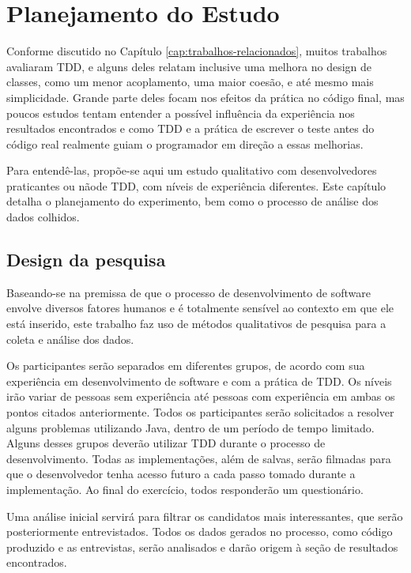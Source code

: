 \chapter{Planejamento do Estudo}
\label{cap:planejamento}

Conforme discutido no Capítulo \ref{cap:trabalhos-relacionados}, muitos 
trabalhos avaliaram TDD, e alguns deles relatam inclusive uma melhora
no design de classes, como um menor acoplamento, uma maior coesão, e até mesmo
mais simplicidade. 
Grande parte deles focam nos efeitos da prática
no código final, mas poucos estudos tentam entender a possível influência da experiência
nos resultados encontrados e como TDD e a
prática de escrever o teste antes do código real realmente guiam o programador 
em direção a essas melhorias.

Para entendê-las, propõe-se aqui um estudo qualitativo com 
desenvolvedores praticantes ou nãode TDD, com níveis de experiência diferentes.
Este capítulo detalha o planejamento do experimento, 
bem como o processo de análise dos dados colhidos.

\section{Design da pesquisa}

Baseando-se na premissa de que o processo de desenvolvimento de software envolve 
diversos fatores humanos e é totalmente sensível ao contexto em que ele está 
inserido, este trabalho faz uso de métodos qualitativos de pesquisa para a coleta e 
análise dos dados.

Os participantes serão separados em diferentes grupos, de acordo com sua
experiência em desenvolvimento de software e com a prática de TDD. Os níveis
irão variar de pessoas sem experiência até pessoas com experiência em ambas
os pontos citados anteriormente.
Todos os participantes serão
solicitados a resolver alguns problemas utilizando Java, dentro de um
período de tempo limitado. Alguns desses grupos deverão
utilizar TDD durante o processo de desenvolvimento. Todas as implementações,
além de salvas, serão filmadas para que o desenvolvedor tenha acesso futuro
a cada passo tomado durante a implementação.
Ao final do exercício,
todos responderão um questionário.

Uma análise inicial servirá para filtrar os candidatos
mais interessantes, que serão posteriormente entrevistados. 
Todos os dados gerados no processo,
como código produzido e as entrevistas, serão analisados e darão origem
à seção de resultados encontrados.


